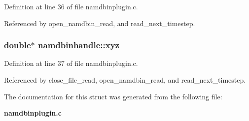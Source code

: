 Definition at line 36 of file namdbinplugin.c.

Referenced by open\_\-namdbin\_\-read, and read\_\-next\_\-timestep.
\subsubsection{\setlength{\rightskip}{0pt plus 5cm}double$\ast$ namdbinhandle::xyz}\label{structnamdbinhandle_m3}




Definition at line 37 of file namdbinplugin.c.

Referenced by close\_\-file\_\-read, open\_\-namdbin\_\-read, and read\_\-next\_\-timestep.

The documentation for this struct was generated from the following file:\begin{CompactItemize}
\item 
{\bf namdbinplugin.c}\end{CompactItemize}
